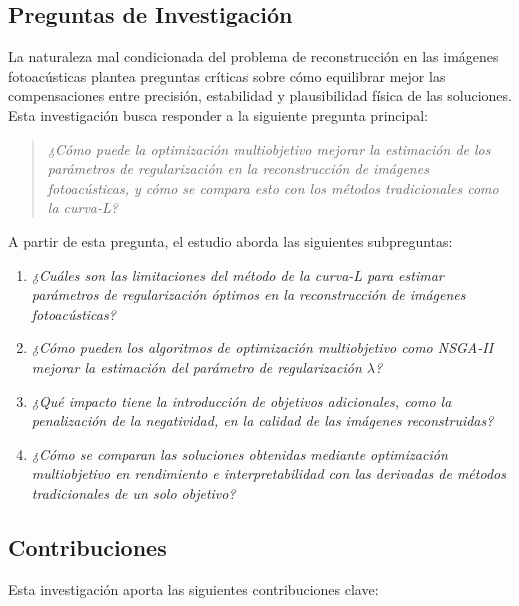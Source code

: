 \subsection{Preguntas de Investigación} \label{sec:ques}

La naturaleza mal condicionada del problema de reconstrucción en las imágenes fotoacústicas plantea preguntas críticas sobre cómo equilibrar mejor las compensaciones entre precisión, estabilidad y plausibilidad física de las soluciones. Esta investigación busca responder a la siguiente pregunta principal:

\begin{quote}
    \textit{¿Cómo puede la optimización multiobjetivo mejorar la estimación de los parámetros de regularización en la reconstrucción de imágenes fotoacústicas, y cómo se compara esto con los métodos tradicionales como la curva-L?}
\end{quote}

A partir de esta pregunta, el estudio aborda las siguientes subpreguntas:

\begin{enumerate}[start=1,label={RQ\arabic*:},wide = 0pt, leftmargin = 3em]
    \item \textit{¿Cuáles son las limitaciones del método de la curva-L para estimar parámetros de regularización óptimos en la reconstrucción de imágenes fotoacústicas?}
    \item \textit{¿Cómo pueden los algoritmos de optimización multiobjetivo como NSGA-II mejorar la estimación del parámetro de regularización \( \lambda \)?}
    \item \textit{¿Qué impacto tiene la introducción de objetivos adicionales, como la penalización de la negatividad, en la calidad de las imágenes reconstruidas?}
    \item \textit{¿Cómo se comparan las soluciones obtenidas mediante optimización multiobjetivo en rendimiento e interpretabilidad con las derivadas de métodos tradicionales de un solo objetivo?}
\end{enumerate}

\subsection{Contribuciones} \label{sec:cont}

Esta investigación aporta las siguientes contribuciones clave:

